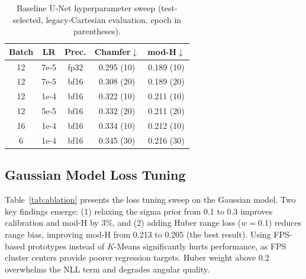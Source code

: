 \documentclass[conference]{IEEEtran}
\begin{document}
\begin{table}[t]
\centering
\caption{Baseline U-Net hyperparameter sweep (test-selected, legacy-Cartesian evaluation, epoch in parentheses).}
\label{tab:sweep}
\footnotesize
\begin{tabular}{ccccc}
\toprule
Batch & LR & Prec. & Chamfer$\downarrow$ & mod-H$\downarrow$ \\
\midrule
12 & 7e-5 & fp32 & 0.295 (10) & 0.189 (10) \\
12 & 7e-5 & bf16 & 0.308 (20) & 0.189 (20) \\
12 & 1e-4 & bf16 & 0.322 (10) & 0.211 (10) \\
12 & 5e-5 & bf16 & 0.332 (20) & 0.211 (20) \\
16 & 1e-4 & bf16 & 0.334 (10) & 0.212 (10) \\
6 & 1e-4 & bf16 & 0.345 (30) & 0.216 (30) \\
\bottomrule
\end{tabular}
\end{table}

\subsection{Gaussian Model Loss Tuning}

Table~\ref{tab:ablation} presents the loss tuning sweep on the Gaussian model.
Two key findings emerge: (1) relaxing the sigma prior from 0.1 to 0.3 improves calibration and mod-H by 3\%, and (2) adding Huber range loss ($w\!=\!0.1$) reduces range bias, improving mod-H from 0.213 to 0.205 (the best result).
Using FPS-based prototypes instead of $K$-Means significantly hurts performance, as FPS cluster centers provide poorer regression targets.
Huber weight above 0.2 overwhelms the NLL term and degrades angular quality.
\end{document}

